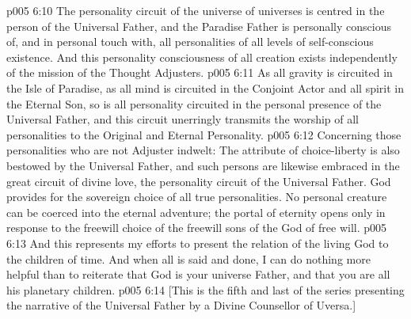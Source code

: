 \vs p005 6:10 \pc The personality circuit of the universe of universes is centred in the person of the Universal Father, and the Paradise Father is personally conscious of, and in personal touch with, all personalities of all levels of self\hyp{}conscious existence. And this personality consciousness of all creation exists independently of the mission of the Thought Adjusters.
\vs p005 6:11 \pc As all gravity is circuited in the Isle of Paradise, as all mind is circuited in the Conjoint Actor and all spirit in the Eternal Son, so is all personality circuited in the personal presence of the Universal Father, and this circuit unerringly transmits the worship of all personalities to the Original and Eternal Personality.
\vs p005 6:12 \pc Concerning those personalities who are not Adjuster indwelt: The attribute of choice\hyp{}liberty is also bestowed by the Universal Father, and such persons are likewise embraced in the great circuit of divine love, the personality circuit of the Universal Father. God provides for the sovereign choice of all true personalities. No personal creature can be coerced into the eternal adventure; the portal of eternity opens only in response to the freewill choice of the freewill sons of the God of free will.
\vs p005 6:13 \pc And this represents my efforts to present the relation of the living God to the children of time. And when all is said and done, I can do nothing more helpful than to reiterate that God is your universe Father, and that you are all his planetary children.
\vsetoff
\vs p005 6:14 [This is the fifth and last of the series presenting the narrative of the Universal Father by a Divine Counsellor of Uversa.]
\quizlink
{}
